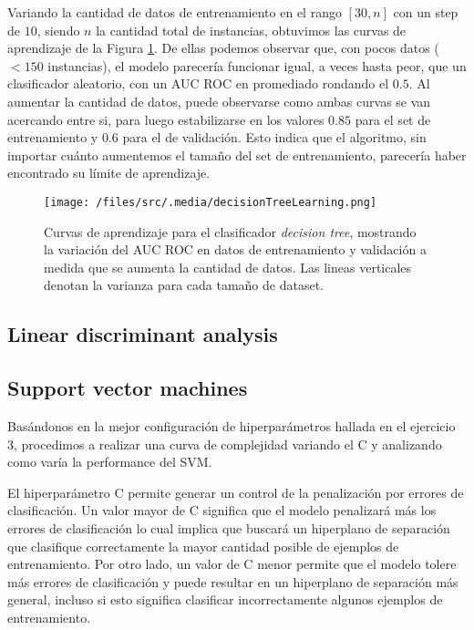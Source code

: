 
Variando la cantidad de datos de entrenamiento en el rango $[30, n]$ con un step de $10$, siendo $n$ la cantidad total de instancias, obtuvimos las curvas de aprendizaje de la Figura \ref{decisionTreeLearning}. De ellas podemos observar que, con pocos datos ($< 150$ instancias), el modelo parecería funcionar igual, a veces hasta peor, que un clasificador aleatorio, con un AUC ROC en promediado rondando el $0.5$. Al aumentar la cantidad de datos, puede observarse como ambas curvas se van acercando entre si, para luego estabilizarse en los valores $0.85$ para el set de entrenamiento y $0.6$ para el de validación. Esto indica que el algoritmo, sin importar cuánto aumentemos el tamaño del set de entrenamiento, parecería haber encontrado su límite de aprendizaje.

\begin{figure}[!htbp]
    \centering
    \texttt{[image: /files/src/.media/decisionTreeLearning.png]}
    \caption{Curvas de aprendizaje para el clasificador \textit{decision tree}, mostrando la variación del AUC ROC en datos de entrenamiento y validación a medida que se aumenta la cantidad de datos. Las lineas verticales denotan la varianza para cada tamaño de dataset.}
    \label{decisionTreeLearning}
\end{figure}

\subsection{Linear discriminant analysis}

\subsection{Support vector machines}

Basándonos en la mejor configuración de hiperparámetros hallada en el ejercicio 3, procedimos a realizar una curva de complejidad variando el C y analizando como varía la performance del SVM. 

El hiperparámetro C permite generar un control de la penalización por errores de clasificación. Un valor mayor de C significa que el modelo penalizará más los errores de clasificación lo cual implica que buscará un hiperplano de separación que clasifique correctamente la mayor cantidad posible de ejemplos de entrenamiento. Por otro lado, un valor de C menor permite que el modelo tolere más errores de clasificación y puede resultar en un hiperplano de separación más general, incluso si esto significa clasificar incorrectamente algunos ejemplos de entrenamiento.

